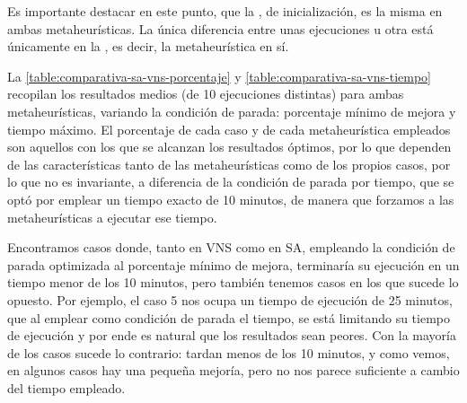 Es importante destacar en este punto, que la \faseuno{}, de inicialización, es la misma en ambas metaheurísticas. La única diferencia entre unas ejecuciones u otra está únicamente en la \fasedos{}, es decir, la metaheurística en sí.

La \autoref{table:comparativa-sa-vns-porcentaje} y \ref{table:comparativa-sa-vns-tiempo} recopilan los resultados medios (de 10 ejecuciones distintas) para ambas metaheurísticas, variando la condición de parada: porcentaje mínimo de mejora y tiempo máximo. El porcentaje de cada caso y de cada metaheurística empleados son aquellos con los que se alcanzan los resultados óptimos, por lo que dependen de las características tanto de las metaheurísticas como de los propios casos, por lo que no es invariante, a diferencia de la condición de parada por tiempo, que se optó por emplear un tiempo exacto de 10 minutos, de manera que forzamos a las metaheurísticas a ejecutar ese tiempo. 

Encontramos casos donde, tanto en VNS como en SA, empleando la condición de parada optimizada al porcentaje mínimo de mejora, terminaría su ejecución en un tiempo menor de los 10 minutos, pero también tenemos casos en los que sucede lo opuesto. Por ejemplo, el caso 5 nos ocupa un tiempo de ejecución de 25 minutos, que al emplear como condición de parada el tiempo, se está limitando su tiempo de ejecución y por ende es natural que los resultados sean peores. Con la mayoría de los casos sucede lo contrario: tardan menos de los 10 minutos, y como vemos, en algunos casos hay una pequeña mejoría, pero no nos parece suficiente a cambio del tiempo empleado.

